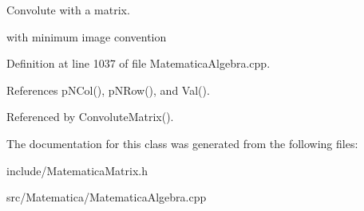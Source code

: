 Convolute with a matrix. 

with minimum image convention 

Definition at line 1037 of file Matematica\+Algebra.\+cpp.



References p\+N\+Col(), p\+N\+Row(), and Val().



Referenced by Convolute\+Matrix().



The documentation for this class was generated from the following files\+:\begin{DoxyCompactItemize}
\item 
include/Matematica\+Matrix.\+h\item 
src/\+Matematica/Matematica\+Algebra.\+cpp\end{DoxyCompactItemize}
